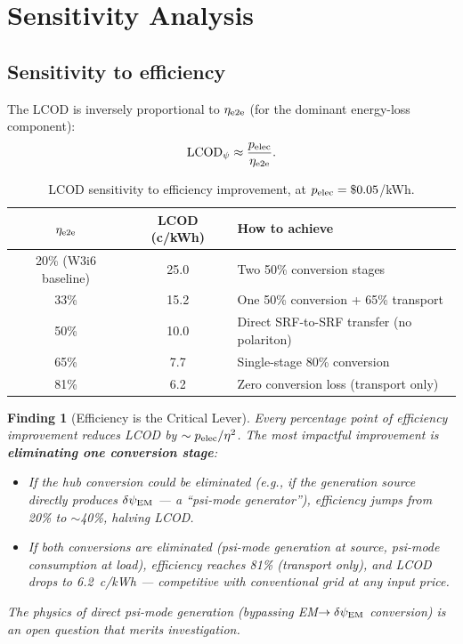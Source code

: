 \documentclass[11pt]{article}
\newtheorem{finding}{Finding}
\newcommand{\dpsiEM}{\delta\psi_{\rm EM}}
\begin{document}
\section{Sensitivity Analysis}
\label{sec:P12-sensitivity}

\subsection{Sensitivity to efficiency}

The LCOD is inversely proportional to $\eta_{\rm e2e}$ (for the
dominant energy-loss component):
\begin{equation}
\text{LCOD}_\psi \approx \frac{p_{\rm elec}}{\eta_{\rm e2e}}.
\end{equation}

\begin{table}[h]
\centering
\caption{LCOD sensitivity to efficiency improvement, at $p_{\rm elec}
= \$0.05$/kWh.}
\label{tab:sensitivity-eta}
\begin{tabular}{ccl}
\toprule
$\eta_{\rm e2e}$ & LCOD (c/kWh) & How to achieve \\
\midrule
20\% (W3i6 baseline) & 25.0 & Two 50\% conversion stages \\
33\% & 15.2 & One 50\% conversion + 65\% transport \\
50\% & 10.0 & Direct SRF-to-SRF transfer (no polariton) \\
65\% & 7.7 & Single-stage 80\% conversion \\
81\% & 6.2 & Zero conversion loss (transport only) \\
\bottomrule
\end{tabular}
\end{table}

\begin{finding}[Efficiency is the Critical Lever]
\label{find:efficiency-lever}
Every percentage point of efficiency improvement reduces LCOD by
$\sim p_{\rm elec}/\eta^2$. The most impactful improvement is
\textbf{eliminating one conversion stage}:

\begin{itemize}[nosep]
  \item If the hub conversion could be eliminated (e.g., if the
    generation source directly produces $\dpsiEM$ --- a ``psi-mode
    generator''), efficiency jumps from 20\% to $\sim$40\%, halving LCOD.
  \item If \emph{both} conversions are eliminated (psi-mode generation
    at source, psi-mode consumption at load), efficiency reaches 81\%
    (transport only), and LCOD drops to 6.2~c/kWh --- competitive with
    conventional grid at any input price.
\end{itemize}

The physics of direct psi-mode generation (bypassing EM$\to\dpsiEM$
conversion) is an open question that merits investigation.
\end{finding}
\end{document}
